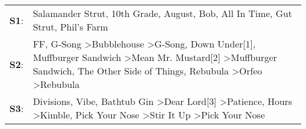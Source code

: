 \begin{supertabular}{p{0.03\textwidth}p{0.92\textwidth}}
 \textbf{S1}:  &                                                                                                                                                                                                                                                                                                     Salamander Strut\textsuperscript{}, \enspace 10th Grade\textsuperscript{}, \enspace August\textsuperscript{}, \enspace Bob\textsuperscript{}, \enspace All In Time\textsuperscript{}, \enspace Gut Strut\textsuperscript{}, \enspace Phil's Farm\textsuperscript{}  \enspace  \\
 \textbf{S2}:  &  FF\textsuperscript{}, \enspace G-Song\textsuperscript{} \textgreater \enspace Bubblehouse\textsuperscript{} \textgreater \enspace G-Song\textsuperscript{}, \enspace Down Under[1]\textsuperscript{}, \enspace Muffburger Sandwich\textsuperscript{} \textgreater \enspace Mean Mr. Mustard[2]\textsuperscript{} \textgreater \enspace Muffburger Sandwich\textsuperscript{}, \enspace The Other Side of Things\textsuperscript{}, \enspace Rebubula\textsuperscript{} \textgreater \enspace Orfeo\textsuperscript{} \textgreater \enspace Rebubula\textsuperscript{}  \enspace  \\
 \textbf{S3}:  &                                                                                                                       Divisions\textsuperscript{}, \enspace Vibe\textsuperscript{}, \enspace Bathtub Gin\textsuperscript{} \textgreater \enspace Dear Lord[3]\textsuperscript{} \textgreater \enspace Patience\textsuperscript{}, \enspace Hours\textsuperscript{} \textgreater \enspace Kimble\textsuperscript{}, \enspace Pick Your Nose\textsuperscript{} \textgreater \enspace Stir It Up\textsuperscript{} \textgreater \enspace Pick Your Nose\textsuperscript{}  \enspace  \\
\end{supertabular}
